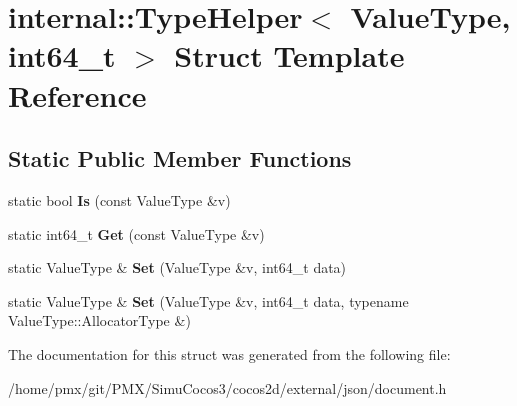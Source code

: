 \hypertarget{structinternal_1_1TypeHelper_3_01ValueType_00_01int64__t_01_4}{}\section{internal\+:\+:Type\+Helper$<$ Value\+Type, int64\+\_\+t $>$ Struct Template Reference}
\label{structinternal_1_1TypeHelper_3_01ValueType_00_01int64__t_01_4}
\subsection*{Static Public Member Functions}
\begin{DoxyCompactItemize}
\item 
\mbox{\label{structinternal_1_1TypeHelper_3_01ValueType_00_01int64__t_01_4_a43c171bfbe873941a1b2be698a95de74}} 
static bool {\bfseries Is} (const Value\+Type \&v)
\item 
\mbox{\label{structinternal_1_1TypeHelper_3_01ValueType_00_01int64__t_01_4_abe3368c8817cafe420a8b3f7d6ec1759}} 
static int64\+\_\+t {\bfseries Get} (const Value\+Type \&v)
\item 
\mbox{\label{structinternal_1_1TypeHelper_3_01ValueType_00_01int64__t_01_4_a0c7b71569c12346902a396111782b12b}} 
static Value\+Type \& {\bfseries Set} (Value\+Type \&v, int64\+\_\+t data)
\item 
\mbox{\label{structinternal_1_1TypeHelper_3_01ValueType_00_01int64__t_01_4_a85471fa774b4a8f4f56c191694a7f278}} 
static Value\+Type \& {\bfseries Set} (Value\+Type \&v, int64\+\_\+t data, typename Value\+Type\+::\+Allocator\+Type \&)
\end{DoxyCompactItemize}


The documentation for this struct was generated from the following file\+:\begin{DoxyCompactItemize}
\item 
/home/pmx/git/\+P\+M\+X/\+Simu\+Cocos3/cocos2d/external/json/document.\+h\end{DoxyCompactItemize}

